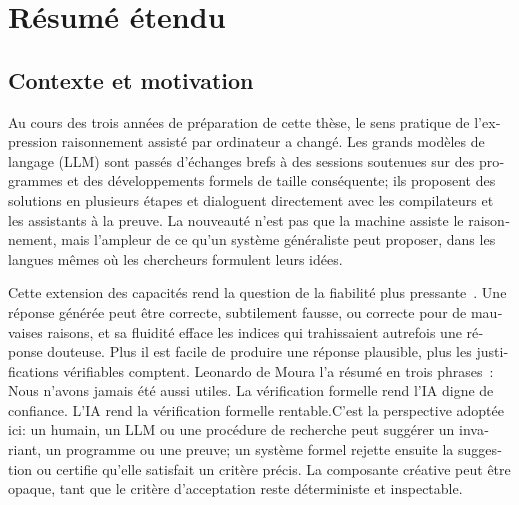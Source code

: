 \chapter*{Résumé étendu}

\begin{otherlanguage}{french}

\begingroup
\tikzexternaldisable
\captionsetup{list=false}
\renewcommand{\thefigure}{\arabic{figure}}
\setcounter{figure}{0}

\section*{Contexte et motivation}

Au cours des trois années de préparation de cette thèse, le sens pratique de
l'expression \og raisonnement assisté par ordinateur \fg a changé. Les grands
modèles de langage (LLM) sont passés d'échanges brefs à des sessions soutenues
sur des programmes et des développements formels de taille conséquente; ils
proposent des solutions en plusieurs étapes et dialoguent directement avec les
compilateurs et les assistants à la preuve. La nouveauté n'est pas que la
machine assiste le raisonnement, mais l'ampleur de ce qu'un système
généraliste peut proposer, dans les langues mêmes où les chercheurs formulent
leurs idées.

Cette extension des capacités rend la question de la fiabilité plus
pressante~\cite{stanfordAIIndex2026}. Une réponse générée peut être
correcte, subtilement fausse, ou correcte pour de mauvaises raisons, et sa fluidité efface les indices qui
trahissaient autrefois une réponse douteuse. Plus il est facile de produire
une réponse plausible, plus les justifications vérifiables comptent. Leonardo
de Moura l'a résumé en trois phrases~\cite{deMoura2026floc}: \og Nous n'avons
jamais été aussi utiles. La vérification formelle rend l'IA digne de
confiance. L'IA rend la vérification formelle rentable.\fg C'est la
perspective adoptée ici: un humain, un LLM ou une procédure de recherche peut
suggérer un invariant, un programme ou une preuve; un système formel rejette
ensuite la suggestion ou certifie qu'elle satisfait un critère précis. La
composante créative peut être opaque, tant que le critère d'acceptation reste
déterministe et inspectable.


\end{otherlanguage}
